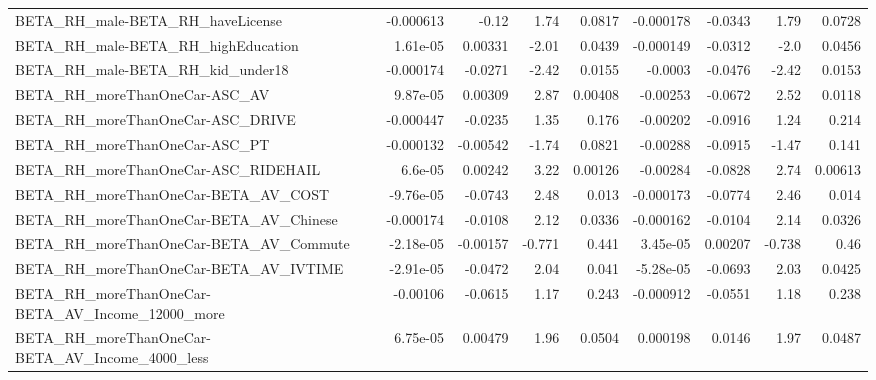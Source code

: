 \begin{tabular}{lrrrrrrrr}
BETA\_RH\_male-BETA\_RH\_haveLicense                   &   -0.000613 &        -0.12 &     1.74 &   0.0817 &  -0.000178 &     -0.0343 &         1.79 &        0.0728 \\
BETA\_RH\_male-BETA\_RH\_highEducation                 &    1.61e-05 &      0.00331 &    -2.01 &   0.0439 &  -0.000149 &     -0.0312 &         -2.0 &        0.0456 \\
BETA\_RH\_male-BETA\_RH\_kid\_under18                   &   -0.000174 &      -0.0271 &    -2.42 &   0.0155 &    -0.0003 &     -0.0476 &        -2.42 &        0.0153 \\
BETA\_RH\_moreThanOneCar-ASC\_AV                      &    9.87e-05 &      0.00309 &     2.87 &  0.00408 &   -0.00253 &     -0.0672 &         2.52 &        0.0118 \\
BETA\_RH\_moreThanOneCar-ASC\_DRIVE                   &   -0.000447 &      -0.0235 &     1.35 &    0.176 &   -0.00202 &     -0.0916 &         1.24 &         0.214 \\
BETA\_RH\_moreThanOneCar-ASC\_PT                      &   -0.000132 &     -0.00542 &    -1.74 &   0.0821 &   -0.00288 &     -0.0915 &        -1.47 &         0.141 \\
BETA\_RH\_moreThanOneCar-ASC\_RIDEHAIL                &     6.6e-05 &      0.00242 &     3.22 &  0.00126 &   -0.00284 &     -0.0828 &         2.74 &       0.00613 \\
BETA\_RH\_moreThanOneCar-BETA\_AV\_COST                &   -9.76e-05 &      -0.0743 &     2.48 &    0.013 &  -0.000173 &     -0.0774 &         2.46 &         0.014 \\
BETA\_RH\_moreThanOneCar-BETA\_AV\_Chinese             &   -0.000174 &      -0.0108 &     2.12 &   0.0336 &  -0.000162 &     -0.0104 &         2.14 &        0.0326 \\
BETA\_RH\_moreThanOneCar-BETA\_AV\_Commute             &   -2.18e-05 &     -0.00157 &   -0.771 &    0.441 &   3.45e-05 &     0.00207 &       -0.738 &          0.46 \\
BETA\_RH\_moreThanOneCar-BETA\_AV\_IVTIME              &   -2.91e-05 &      -0.0472 &     2.04 &    0.041 &  -5.28e-05 &     -0.0693 &         2.03 &        0.0425 \\
BETA\_RH\_moreThanOneCar-BETA\_AV\_Income\_12000\_more   &    -0.00106 &      -0.0615 &     1.17 &    0.243 &  -0.000912 &     -0.0551 &         1.18 &         0.238 \\
BETA\_RH\_moreThanOneCar-BETA\_AV\_Income\_4000\_less    &    6.75e-05 &      0.00479 &     1.96 &   0.0504 &   0.000198 &      0.0146 &         1.97 &        0.0487 \\

\end{tabular}

